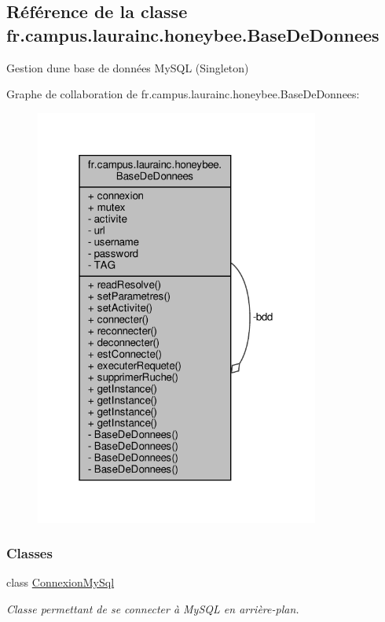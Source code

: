 \hypertarget{classfr_1_1campus_1_1laurainc_1_1honeybee_1_1_base_de_donnees}{}\subsection{Référence de la classe fr.\+campus.\+laurainc.\+honeybee.\+Base\+De\+Donnees}
\label{classfr_1_1campus_1_1laurainc_1_1honeybee_1_1_base_de_donnees}


Gestion d\textquotesingle{}une base de données My\+S\+QL (Singleton)  




Graphe de collaboration de fr.\+campus.\+laurainc.\+honeybee.\+Base\+De\+Donnees\+:\nopagebreak
\begin{figure}[H]
\begin{center}
\leavevmode
\includegraphics[width=265pt]{classfr_1_1campus_1_1laurainc_1_1honeybee_1_1_base_de_donnees__coll__graph}
\end{center}
\end{figure}
\subsubsection*{Classes}
\begin{DoxyCompactItemize}
\item 
class \hyperlink{classfr_1_1campus_1_1laurainc_1_1honeybee_1_1_base_de_donnees_1_1_connexion_my_sql}{Connexion\+My\+Sql}
\begin{DoxyCompactList}\small\item\em Classe permettant de se connecter à My\+S\+QL en arrière-\/plan. \end{DoxyCompactList}\end{DoxyCompactItemize}
